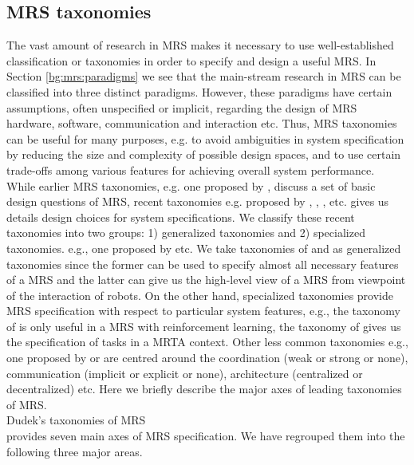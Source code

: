 \subsection{MRS taxonomies}
\label{bg:mrs:taxonomies}
The vast amount of research in MRS makes it necessary to use well-established classification or taxonomies in order to specify and design a useful MRS. In Section \ref{bg:mrs:paradigms} we see that the main-stream research in MRS can be classified into three distinct paradigms. However, these paradigms have certain assumptions, often unspecified or implicit,  regarding the design of MRS hardware, software, communication and interaction etc. Thus, MRS taxonomies can be useful for many purposes, e.g. to avoid ambiguities in system specification by reducing the size and complexity of possible design spaces, and to use certain trade-offs among various features for achieving overall system performance.\\
While earlier MRS taxonomies, e.g. one proposed by ,  discuss a set of basic design questions of MRS, recent taxonomies e.g. proposed by , , ,  etc. gives us details design choices for system specifications. We classify these recent taxonomies into two groups: 1) generalized taxonomies  and 2) specialized taxonomies. e.g., one proposed by   etc. We take taxonomies of  and  as generalized taxonomies since the former can be used to specify almost all necessary features of a MRS and the latter can give us the high-level view of a MRS from viewpoint of the interaction of robots. On the other hand, specialized taxonomies provide MRS specification with respect to particular system features, e.g., the taxonomy of   is only useful in a MRS with reinforcement learning, the taxonomy of  gives us the specification of tasks in a MRTA context.  Other less common taxonomies e.g., one proposed by  or  are centred around the coordination (weak or strong or none), communication (implicit or explicit or none), architecture (centralized or decentralized) etc. Here we briefly describe the major axes of leading taxonomies of MRS.\\
Dudek's taxonomies of MRS\\
 provides seven main axes of MRS specification. We have regrouped them into the following three major areas.\\
